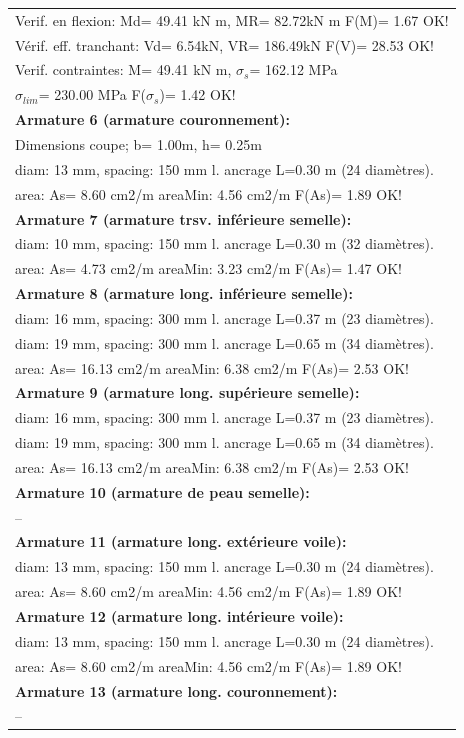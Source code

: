 \begin{center}
\begin{supertabular}[H]{|l|}
  Verif. en flexion: Md=  49.41 kN m, MR=  82.72kN m  F(M)= 1.67 OK!\\
  Vérif. eff. tranchant: Vd=   6.54kN,  VR= 186.49kN  F(V)= 28.53 OK!\\
  Verif. contraintes: M=  49.41 kN m, $\sigma_s$= 162.12 MPa\\
    $\sigma_{lim}$= 230.00 MPa  F($\sigma_s$)= 1.42 OK!\\
\textbf{Armature 6 (armature couronnement):}\\
  Dimensions coupe; b= 1.00m, h= 0.25m\\
  diam: 13 mm, spacing: 150 mm  l. ancrage L=0.30 m (24 diamètres).\\
  area: As=   8.60 cm2/m areaMin:   4.56 cm2/m  F(As)= 1.89 OK!\\
\textbf{Armature 7 (armature trsv. inférieure semelle):}\\
  diam: 10 mm, spacing: 150 mm  l. ancrage L=0.30 m (32 diamètres).\\
  area: As=   4.73 cm2/m areaMin:   3.23 cm2/m  F(As)= 1.47 OK!\\
\textbf{Armature 8 (armature long. inférieure semelle):}\\
  diam: 16 mm, spacing: 300 mm  l. ancrage L=0.37 m (23 diamètres).\\
  diam: 19 mm, spacing: 300 mm  l. ancrage L=0.65 m (34 diamètres).\\
  area: As=  16.13 cm2/m areaMin:   6.38 cm2/m  F(As)= 2.53 OK!\\
\textbf{Armature 9 (armature long. supérieure semelle):}\\
  diam: 16 mm, spacing: 300 mm  l. ancrage L=0.37 m (23 diamètres).\\
  diam: 19 mm, spacing: 300 mm  l. ancrage L=0.65 m (34 diamètres).\\
  area: As=  16.13 cm2/m areaMin:   6.38 cm2/m  F(As)= 2.53 OK!\\
\textbf{Armature 10 (armature de peau semelle):}\\
  --\\
\textbf{Armature 11 (armature long. extérieure voile):}\\
  diam: 13 mm, spacing: 150 mm  l. ancrage L=0.30 m (24 diamètres).\\
  area: As=   8.60 cm2/m areaMin:   4.56 cm2/m  F(As)= 1.89 OK!\\
\textbf{Armature 12 (armature long. intérieure voile):}\\
  diam: 13 mm, spacing: 150 mm  l. ancrage L=0.30 m (24 diamètres).\\
  area: As=   8.60 cm2/m areaMin:   4.56 cm2/m  F(As)= 1.89 OK!\\
\textbf{Armature 13 (armature long. couronnement):}\\
  --\\
\hline
\end{supertabular}
\end{center}
